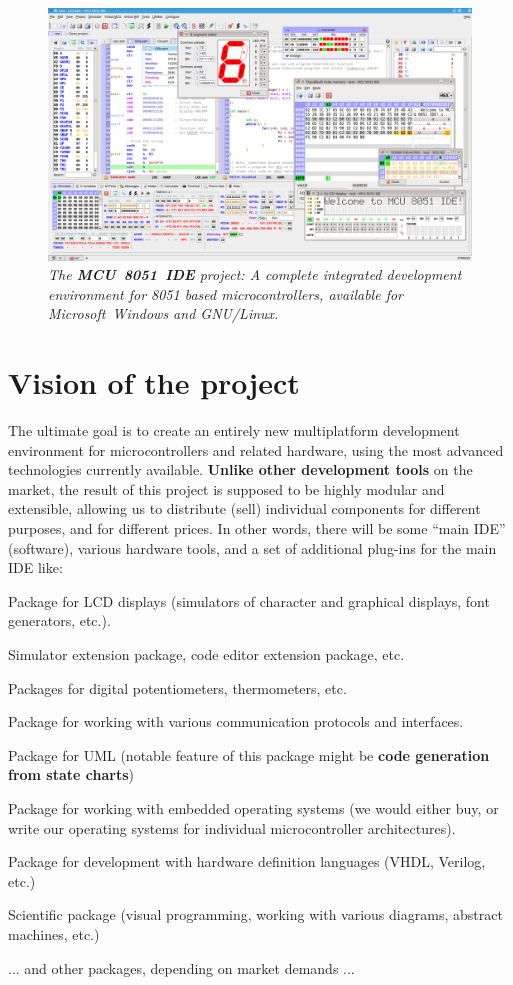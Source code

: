 \documentclass[a4paper,twoside,15pt]{book}
\begin{document}
		\begin{figure}[h!]
			\centering{}
			\includegraphics[width=.9\textwidth]{images/mcu8051ide_0.png}
			\caption{\textit{The \textbf{MCU~8051~IDE} project: A complete integrated development environment for 8051 based microcontrollers, available for Microsoft\textregistered{}~Windows\textregistered{} and GNU/Linux\textregistered{}.}}
		\end{figure}

	\pagebreak

	\section{Vision of the project}
		The ultimate goal is to create an entirely new multiplatform development environment for microcontrollers and related hardware, using the most advanced technologies currently available. \textbf{Unlike other development tools} on the market, the result of this project is supposed to be highly modular and extensible, allowing us to distribute (sell) individual components for different purposes, and for different prices. In other words, there will be some ``main IDE'' (software), various hardware tools, and a set of additional plug-ins for the main IDE like:
		\begin{dinglist}{73}
			\item Package for LCD displays (simulators of character and graphical displays, font generators, etc.).
			\item Simulator extension package, code editor extension package, etc.
			\item Packages for digital potentiometers, thermometers, etc.
			\item Package for working with various communication protocols and interfaces.
			\item Package for UML (notable feature of this package might be \textbf{code generation from state charts})
			\item Package for working with embedded operating systems (we would either buy, or write our operating systems for individual microcontroller architectures).
			\item Package for development with hardware definition languages (VHDL, Verilog, etc.)
			\item Scientific package (visual programming, working with various diagrams, abstract machines, etc.)
			\item ... and other packages, depending on market demands ...
		\end{dinglist}
\end{document}
